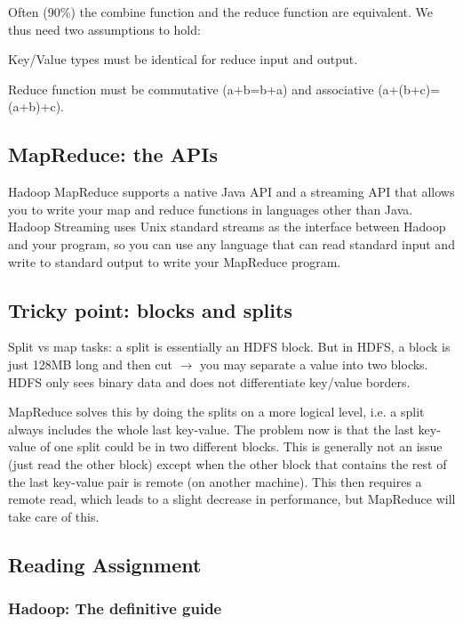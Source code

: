 \documentclass[11pt,oneside,a4paper]{article}
\begin{document}
Often (90\%) the combine function and the reduce function are equivalent. We thus need two assumptions to hold:

\begin{compactitem}
\item Key/Value types must be identical for reduce input and output.
\item Reduce function must be commutative (a+b=b+a) and associative (a+(b+c)=(a+b)+c).
\end{compactitem}

\newpage

\subsection{MapReduce: the APIs}

Hadoop MapReduce supports a native Java API and a streaming API that allows you to write your map and reduce functions in languages other than Java. Hadoop Streaming uses Unix standard streams as the interface between Hadoop and your program, so you can use any language that can read standard input and write to standard output to write your MapReduce program.


\subsection{Tricky point: blocks and splits}

Split vs map tasks: a split is essentially an HDFS block. But in HDFS, a block is just 128MB long and then cut $\rightarrow$ you may separate a value into two blocks. HDFS only sees binary data and does not differentiate key/value borders.

MapReduce solves this by doing the splits on a more logical level, i.e. a split always includes the whole last key-value. The problem now is that the last key-value of one split could be in two different blocks. This is generally not an issue (just read the other block) except when the other block that contains the rest of the last key-value pair is remote (on another machine). This then requires a remote read, which leads to a slight decrease in performance, but MapReduce will take care of this.

\subsection{Reading Assignment}

\subsubsection{Hadoop: The definitive guide}
\end{document}
